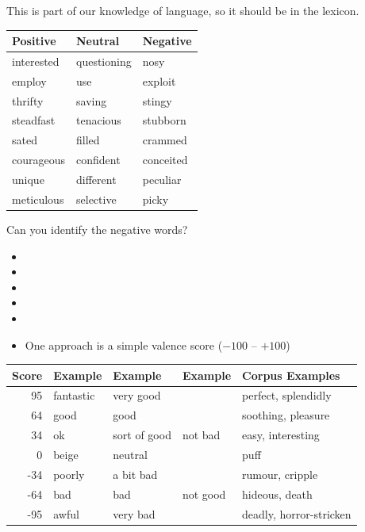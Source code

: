 \documentclass[a4paper,landscape,headrule,footrule,xetex]{foils}
\begin{document}
This is part of our knowledge of language, so it should be in the lexicon.


\begin{tabular}{lll}
  Positive& Neutral& Negative \\ \hline
interested & questioning & nosy \\
employ & use & exploit \\
thrifty & saving & stingy \\
steadfast & tenacious & stubborn \\
sated & filled & crammed \\
courageous & confident & conceited \\
unique & different & peculiar \\
meticulous & selective & picky \\
\end{tabular}

Can you identify the negative words?\task
\begin{itemize}\addtolength{\itemsep}{-2ex}
\item {}
\item {}
\item {}
\item {}
\item {}
  \end{itemize}
  

\begin{itemize}
\item One approach is a simple valence score ($-100$ -- $+100$)
\end{itemize}

    \begin{tabular}{rllll}
      \textbf{Score} & \textbf{Example} & \textbf{Example} & \textbf{Example} & 
      \textbf{Corpus Examples} \\
      \hline
      95 & fantastic & very good     &            & {perfect}, splendidly  \\ 
      64 & good      & good          &            & {soothing}, pleasure  \\
      34 & ok        & sort of good  & not bad    & {easy}, interesting  \\ 
      0  & beige     & neutral       &            & {puff}  \\  
      -34 & poorly    & a bit bad     &            & rumour, cripple  \\
      -64 & bad       & bad           & not good   & {hideous}, death  \\
      -95 & awful     & very bad      &            & {deadly}, horror-stricken     
\end{tabular}
\end{document}
